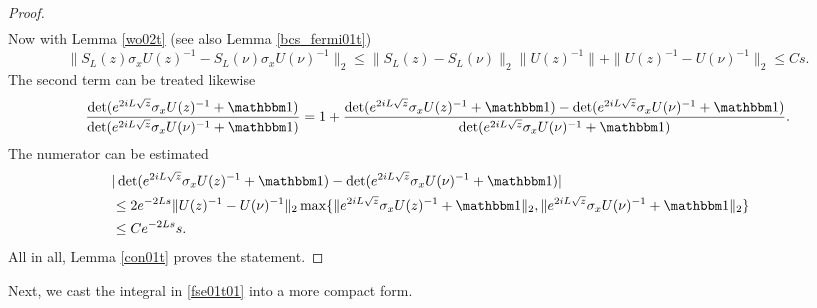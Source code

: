 \begin{proof}
\begin{equation*}
\begin{split}
\end{split}
\end{equation*}
Now with Lemma \ref{wo02t} (see also Lemma \ref{bcs_fermi01t})
\begin{equation*}
  \|S_L(z)\sigma_x U(z)^{-1} - S_L(\nu)\sigma_x U(\nu)^{-1}\|_2
      \leq \|S_L(z)-S_L(\nu)\|_2 \|U(z)^{-1}\| + \|U(z)^{-1}-U(\nu)^{-1}\|_2 
      \leq C s .
\end{equation*}
The second term can be treated likewise
\begin{equation*}
  \frac{\det(e^{2iL\sqrt{z}}\sigma_x U(z)^{-1} + \id)}{\det(e^{2iL\sqrt{z}}\sigma_x U(\nu)^{-1} + \id)}
     = 1 + \frac{\det(e^{2iL\sqrt{z}}\sigma_x U(z)^{-1} + \id) 
                  - \det(e^{2iL\sqrt{z}}\sigma_x U(\nu)^{-1} + \id)}{\det(e^{2iL\sqrt{z}}\sigma_x U(\nu)^{-1} + \id)} .
\end{equation*}
The numerator can be estimated
\begin{equation*}
\begin{split}
  \lefteqn{|\det(e^{2iL\sqrt{z}}\sigma_x U(z)^{-1} + \id) - \det(e^{2iL\sqrt{z}}\sigma_x U(\nu)^{-1} + \id)|}\\
    & \leq 2 e^{-2Ls}\|U(z)^{-1}-U(\nu)^{-1}\|_2 
         \max\{\|e^{2iL\sqrt{z}}\sigma_x U(z)^{-1} + \id\|_2 ,\|e^{2iL\sqrt{z}}\sigma_x U(\nu)^{-1} + \id\|_2\} \\
    & \leq C e^{-2Ls} s .
\end{split}
\end{equation*}
All in all, Lemma \ref{con01t} proves the statement.
\end{proof}

Next, we cast the integral in \eqref{fse01t01} into a more compact form.

